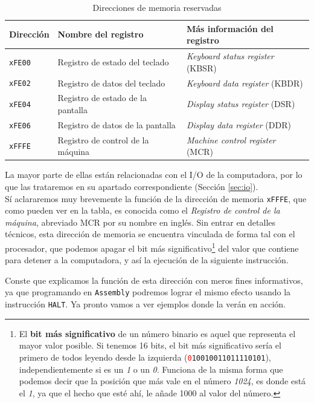 \documentclass[a4paper, titlepage]{report}
\begin{document}
	\begin{table}[h]
		\centering
		\begin{tabular}{l l l}
			\toprule
			\textbf{Dirección} & \textbf{Nombre del registro} & \textbf{Más información del registro} \\ \midrule
			\texttt{xFE00} & Registro de estado del teclado & \textit{Keyboard status register} (KBSR) \\
			\texttt{xFE02} & Registro de datos del teclado & \textit{Keyboard data register} (KBDR)\\
			\texttt{xFE04} & Registro de estado de la pantalla & \textit{Display status register} (DSR)\\
			\texttt{xFE06} & Registro de datos de la pantalla & \textit{Display data register} (DDR)\\
			\texttt{xFFFE} & Registro de control de la máquina & \textit{Machine control register} (MCR) \\
			\bottomrule
		\end{tabular}
		\caption{Direcciones de memoria reservadas}
		\label{table:reserved-mem}
	\end{table}

	La mayor parte de ellas están relacionadas con el I/O de la computadora, por lo que las trataremos en su apartado correspondiente (Sección \ref{sec:io}).\\
	
	Sí aclararemos muy brevemente la función de la dirección de memoria \texttt{xFFFE}, que como pueden ver en la tabla, es conocida como el \textit{Registro de control de la máquina}, abreviado MCR por su nombre en inglés. Sin entrar en detalles técnicos, esta dirección de memoria se encuentra vinculada de forma tal con el procesador, que podemos apagar el bit más significativo\footnote{El \textbf{bit más significativo} de un número binario es aquel que representa el mayor valor posible. Si tenemos 16 bits, el bit más significativo sería el primero de todos leyendo desde la izquierda (\texttt{\textcolor{red}{0}10010011011110101}), independientemente si es un \textit{1} o un \textit{0}. Funciona de la misma forma que podemos decir que la posición que más vale en el número \textit{1024}, es donde está el \textit{1}, ya que el hecho que esté ahí, le añade 1000 al valor del número.} del valor que contiene para detener a la computadora, y así la ejecución de la siguiente instrucción.
	
	Conste que explicamos la función de esta dirección con meros fines informativos, ya que programando en \texttt{Assembly} podremos lograr el mismo efecto usando la instrucción \texttt{HALT}. Ya pronto vamos a ver ejemplos donde la verán en acción.
	
\end{document}
